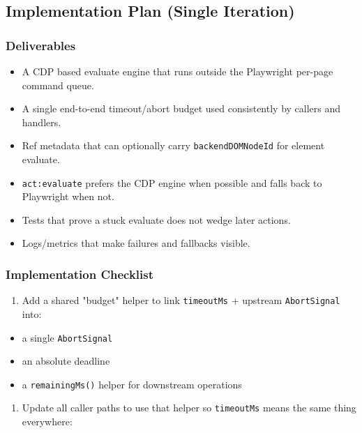 \subsection{Implementation Plan (Single Iteration)}


\subsubsection{Deliverables}


\begin{itemize}
  \item A CDP based evaluate engine that runs outside the Playwright per-page command queue.
  \item A single end-to-end timeout/abort budget used consistently by callers and handlers.
  \item Ref metadata that can optionally carry \texttt{backendDOMNodeId} for element evaluate.
  \item \texttt{act:evaluate} prefers the CDP engine when possible and falls back to Playwright when not.
  \item Tests that prove a stuck evaluate does not wedge later actions.
  \item Logs/metrics that make failures and fallbacks visible.
\end{itemize}


\subsubsection{Implementation Checklist}


\begin{enumerate}
  \item Add a shared "budget" helper to link \texttt{timeoutMs} + upstream \texttt{AbortSignal} into:
\end{enumerate}

\begin{itemize}
  \item a single \texttt{AbortSignal}
  \item an absolute deadline
  \item a \texttt{remainingMs()} helper for downstream operations
\end{itemize}

\begin{enumerate}
  \item Update all caller paths to use that helper so \texttt{timeoutMs} means the same thing everywhere:
\end{enumerate}

